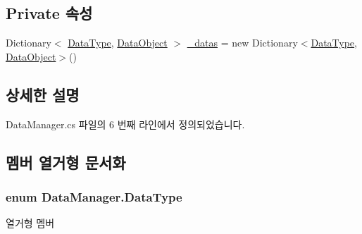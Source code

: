 \subsection*{Private 속성}
\begin{DoxyCompactItemize}
\item 
Dictionary$<$ \hyperlink{class_data_manager_ac9cb5bf021d3ebcc7f3eaa4bf5393408}{Data\+Type}, \hyperlink{class_data_object}{Data\+Object} $>$ \hyperlink{class_data_manager_a01ff3ff6f614ac0840d1209110710666}{\+\_\+datas} = new Dictionary$<$\hyperlink{class_data_manager_ac9cb5bf021d3ebcc7f3eaa4bf5393408}{Data\+Type}, \hyperlink{class_data_object}{Data\+Object}$>$()
\end{DoxyCompactItemize}


\subsection{상세한 설명}


Data\+Manager.\+cs 파일의 6 번째 라인에서 정의되었습니다.



\subsection{멤버 열거형 문서화}
\subsubsection[{\texorpdfstring{Data\+Type}{DataType}}]{\setlength{\rightskip}{0pt plus 5cm}enum {\bf Data\+Manager.\+Data\+Type}\hspace{0.3cm}{\ttfamily [strong]}}\hypertarget{class_data_manager_ac9cb5bf021d3ebcc7f3eaa4bf5393408}{}\label{class_data_manager_ac9cb5bf021d3ebcc7f3eaa4bf5393408}
\begin{Desc}
\item[열거형 멤버]\par
\begin{description}
\item[{\em 
U\+N\+IT\hypertarget{class_data_manager_ac9cb5bf021d3ebcc7f3eaa4bf5393408aec8fc2c42b9c76effd648a14b311411f}{}\label{class_data_manager_ac9cb5bf021d3ebcc7f3eaa4bf5393408aec8fc2c42b9c76effd648a14b311411f}
}]\end{description}
\end{Desc}


